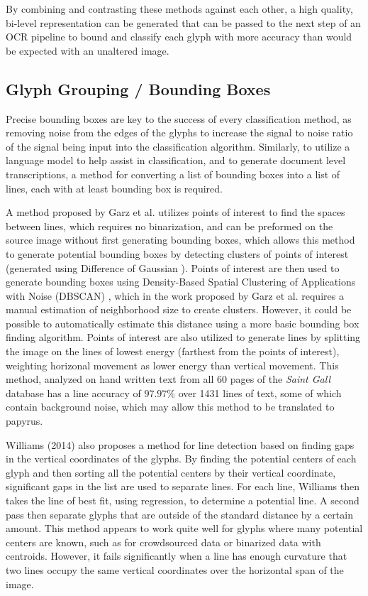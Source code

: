 \documentclass[12pt,a4paper,final]{article}
\begin{document}
By combining and contrasting these methods against each other, a high quality, bi-level representation can be generated that can be passed to the next step of an OCR pipeline to bound and classify each glyph with more accuracy than would be expected with an unaltered image.

\subsection{Glyph Grouping / Bounding Boxes}
Precise bounding boxes are key to the success of every classification method, as removing noise from the edges of the glyphs to increase the signal to noise ratio of the signal being input into the classification algorithm. Similarly, to utilize a language model to help assist in classification, and to generate document level transcriptions, a method for converting a list of bounding boxes into a list of lines, each with at least bounding box is required.

A method proposed by Garz et al.\cite{Garz} utilizes points of interest to find the spaces between lines, which requires no binarization, and can be preformed on the source image without first generating bounding boxes, which allows this method to generate potential bounding boxes by detecting clusters of points of interest (generated using Difference of Gaussian \cite{Lowe}). Points of interest are then used to generate bounding boxes using Density-Based Spatial Clustering of Applications with Noise (DBSCAN) \cite{Ester}, which in the work proposed by Garz et al.\cite{Garz} requires a manual estimation of neighborhood size to create clusters. However, it could be possible to automatically estimate this distance using a more basic bounding box finding algorithm. Points of interest are also utilized to generate lines by splitting the image on the lines of lowest energy (farthest from the points of interest), weighting horizonal movement as lower energy than vertical movement.
This method, analyzed on hand written text from all 60 pages of the \textit{Saint Gall} database has a line accuracy of $97.97\%$ over 1431 lines of text, some of which contain background noise, which may allow this method to be translated to papyrus.

Williams (2014)\cite{Williams2014} also proposes a method for line detection based on finding gaps in the vertical coordinates of the glyphs. By finding the potential centers of each glyph and then sorting all the potential centers by their vertical coordinate, significant gaps in the list are used to separate lines. For each line, Williams then takes the line of best fit, using regression, to determine a potential line. A second pass then separate glyphs that are outside of the standard distance by a certain amount. This method appears to work quite well for glyphs where many potential centers are known, such as for crowdsourced data or binarized data with centroids. However, it fails significantly when a line has enough curvature that two lines occupy the same vertical coordinates over the horizontal span of the image.
\end{document}
